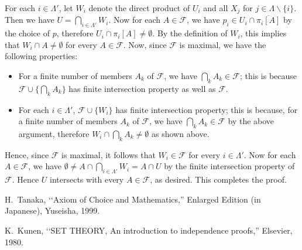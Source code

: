 \documentclass{article}
\begin{document}
For each $i \in \Lambda'$, let $W_i$ denote the direct product of $U_i$ and all $X_j$ for $j \in \Lambda \smallsetminus \{i\}$.
Then we have $U = \bigcap_{i \in \Lambda'} W_i$.
Now for each $A \in \mathcal{F}$, we have $p_i \in U_i \cap \overline{\pi_i[A]}$ by the choice of $p$, therefore $U_i \cap \pi_i[A] \neq \emptyset$.
By the definition of $W_i$, this implies that $W_i \cap A \neq \emptyset$ for every $A \in \mathcal{F}$.
Now, since $\mathcal{F}$ is maximal, we have the following properties:
\begin{itemize}
\item For a finite number of members $A_k$ of $\mathcal{F}$, we have $\bigcap_k A_k \in \mathcal{F}$; this is because $\mathcal{F} \cup \{\bigcap_k A_k\}$ has finite intersection property as well as $\mathcal{F}$.
\item For each $i \in \Lambda'$, $\mathcal{F} \cup \{W_i\}$ has finite intersection property; this is because, for a finite number of members $A_k$ of $\mathcal{F}$, we have $\bigcap_k A_k \in \mathcal{F}$ by the above argument, therefore $W_i \cap \bigcap_k A_k \neq \emptyset$ as shown above.
\end{itemize}
Hence, since $\mathcal{F}$ is maximal, it follows that $W_i \in \mathcal{F}$ for every $i \in \Lambda'$.
Now for each $A \in \mathcal{F}$, we have $\emptyset \neq A \cap \bigcap_{i \in \Lambda'} W_i = A \cap U$ by the finite intersection property of $\mathcal{F}$.
Hence $U$ intersects with every $A \in \mathcal{F}$, as desired.
This completes the proof.

\begin{thebibliography}{9}

H.~Tanaka,
\lq\lq Axiom of Choice and Mathematics,'' Enlarged Edition (in Japanese),
Yuseisha, 1999.

K.~Kunen,
\lq\lq SET THEORY, An introduction to independence proofs,''
Elsevier, 1980.

\end{thebibliography}
\end{document}
